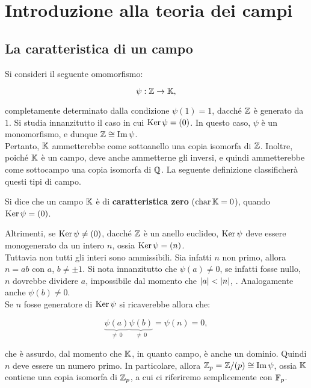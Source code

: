 \documentclass[11pt]{scrbook}
\begin{document}
\chapter{Introduzione alla teoria dei campi}

\section{La caratteristica di un campo}

Si consideri il seguente omomorfismo:

\[ \psi : \mathbb Z \to \mathbb{K}, \]

\vskip 0.1in

completamente determinato dalla condizione $\psi(1) = 1$, dacché
$\mathbb Z$ è generato da $1$. Si studia innanzitutto il caso in cui
$\operatorname{Ker} \psi = (0)$. In questo caso, $\psi$ è un monomorfismo, e dunque
$\mathbb Z \cong \operatorname{Im} \psi$. \\

Pertanto, $\mathbb{K}$ ammetterebbe come sottoanello una copia isomorfa di $\mathbb Z$.
Inoltre, poiché $\mathbb{K}$ è un campo, deve anche ammetterne gli inversi, e quindi
ammetterebbe come sottocampo una copia isomorfa di $\mathbb Q$. La seguente
definizione classificherà questi tipi di campo. \\

\begin{definition}
    Si dice che un campo $\mathbb{K}$ è di \textbf{caratteristica zero} ($\operatorname{char} \mathbb{K} = 0$),
    quando $\operatorname{Ker} \psi = (0)$.
\end{definition}

Altrimenti, se $\operatorname{Ker} \psi \neq (0)$, dacché $\mathbb Z$ è un anello euclideo,
$\operatorname{Ker} \psi$ deve essere monogenerato da un intero $n$, ossia $\operatorname{Ker} \psi = (n)$. \\

Tuttavia non tutti gli interi sono ammissibili. Sia infatti $n$ non primo, allora
$n = ab$ con $a$, $b \neq \pm 1$. Si nota innanzitutto che $\psi(a) \neq 0$,
se infatti fosse nullo, $n$ dovrebbe dividere $a$, impossibile dal momento
che $\left|a\right| < \left|n\right|$, \Lightning{}. Analogamente anche $\psi(b) \neq 0$. \\

Se $n$ fosse generatore di $\operatorname{Ker} \psi$ si ricaverebbe allora che:

\[ \underbrace{\psi(a)}_{\neq\,0} \underbrace{\psi(b)}_{\neq\,0} = \psi(n) = 0, \]

\vskip 0.1in

che è assurdo, dal momento che $\mathbb{K}$, in quanto campo, è anche un dominio.
Quindi $n$ deve essere un numero primo. In particolare, allora $\mathbb{Z}_p = \mathbb Z/(p) \cong \operatorname{Im} \psi$,
ossia $\mathbb{K}$ contiene una copia isomorfa di $\mathbb{Z}_p$, a cui ci riferiremo
semplicemente con $\mathbb{F}_p$. \\
\end{document}
